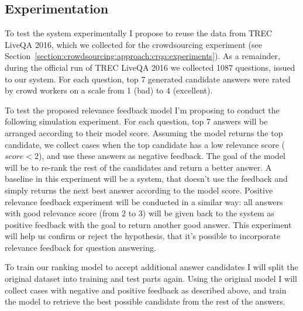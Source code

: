 \subsection{Experimentation}
\label{section:users:proposal:experiments}

To test the system experimentally I propose to reuse the data from TREC LiveQA 2016, which we collected for the crowdsourcing experiment (see Section~\ref{section:crowdsourcing:approach:crqa:experiments}).
As a remainder, during the official run of TREC LiveQA 2016 we collected 1087 questions, issued to our system.
For each question, top 7 generated candidate answers were rated by crowd workers on a scale from 1 (bad) to 4 (excellent).

To test the proposed relevance feedback model I'm proposing to conduct the following simulation experiment.
For each question, top 7 answers will be arranged according to their model score.
Assuming the model returns the top candidate, we collect cases when the top candidate has a low relevance score (\eg $score < 2$), and use these answers as negative feedback.
The goal of the model will be to re-rank the rest of the candidates and return a better answer.
A baseline in this experiment will be a system, that doesn't use the feedback and simply returns the next best answer according to the model score.
Positive relevance feedback experiment will be conducted in a similar way: all answers with good relevance score (\eg from 2 to 3) will be given back to the system as positive feedback with the goal to return another good answer.
This experiment will help us confirm or reject the hypothesis, that it's possible to incorporate relevance feedback for question answering.

To train our ranking model to accept additional answer candidates I will split the original dataset into training and test parts again.
Using the original model I will collect cases with negative and positive feedback as described above, and train the model to retrieve the best possible candidate from the rest of the answers.


